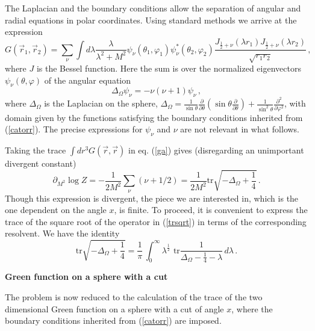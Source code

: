 \documentclass[11pt]{article}
\begin{document}
The Laplacian and the boundary conditions allow the separation of angular and radial equations in polar coordinates. Using standard methods we arrive at the expression 
\begin{equation}
G(\vec{r}_1,\vec{r}_2)=\sum_\nu \int d\lambda \frac{\lambda}{\lambda^2+M^2}\psi_{\nu}( \theta_1 , \varphi_1)\psi^*_{\nu}(\theta_2 , \varphi_2)\frac{J_{\frac{1}{2}+\nu}(\lambda r_1)J_{\frac{1}{2}+\nu}(\lambda r_2)}{\sqrt{r_1 r_2}}\,,
\label{ga}
\end{equation}
where $J$ is the Bessel function. Here the sum is over the normalized eigenvectors $\psi_{\nu}(\theta , \varphi)$ of the angular equation 
\begin{equation}
\Delta_{\Omega}\psi_{\nu}=-\nu(\nu+1)\psi_{\nu}\,,
\end{equation}
where $\Delta_{\Omega}$ is the Laplacian on the sphere, 
 $
\Delta_{\Omega}=\frac{1}{\sin \theta}\frac{\partial}{\partial \theta}(\sin\theta\frac{\partial}{\partial \theta})+\frac{1}{\sin^2\theta}\frac{\partial^2}{\partial \varphi^2}
$, 
with domain given by the functions satisfying the boundary conditions inherited from (\ref{catorr}). 
 The precise expressions for $\psi_{\nu}$ and $\nu$ are not relevant in what follows.  




Taking the trace $\int dr^3 G(\vec{r},\vec{r})$ in eq. (\ref{ga}) gives (disregarding an unimportant divergent constant)
\begin{equation}
\partial_{M^2}\log Z=-\frac{1}{2M^2}\sum_{\nu}(\nu+1/2)=\frac{1}{2M^2}\textrm{tr}\sqrt{-\Delta_{\Omega}+\frac{1}{4}}\,.
\label{trsqrt}
\end{equation}
Though this expression is divergent, the piece we are interested in, which is the one dependent on the angle $x$, is finite. 
 To proceed, it is convenient to express the trace of the square root of the operator in (\ref{trsqrt}) in terms of the corresponding resolvent.  We have the identity \cite{seeley}  
\begin{equation}
\textrm{tr}  \sqrt{-\Delta_{\Omega}+\frac{1}{4}}=\frac{1}{\pi}\,\int_0^{\infty}\lambda^{\frac{1}{2}}\,\,\textrm{tr}\frac{1}{\Delta_{\Omega}-\frac{1}{4}-\lambda}\, d\lambda 
\,.
\label{tr}
\end{equation}

 

\smallskip 

\noindent\textbf{Green function on a sphere with a cut}

\noindent The problem is now reduced to the calculation of the trace of the two dimensional Green function on a sphere with a cut of angle $x$, where the boundary conditions inherited from (\ref{catorr}) are imposed. 
 
\end{document}
